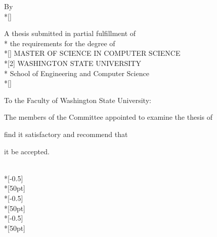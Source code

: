 \doublespacing

\begin{titlepage}
    \begin{center}
        \begin{doublespace}
            {\Large \textbf{\covertitle}}
        \end{doublespace}
	     
        \begin{singlespace}
            \vfill
            By \\*[\baselineskip]
            \textbf{\MakeUppercase \paperauthor}
           
            \vfill
            A thesis submitted in partial fulfillment of\\*
            the requirements for the degree of\\*[\baselineskip]
            MASTER OF SCIENCE IN COMPUTER SCIENCE\\*[2\baselineskip]
            WASHINGTON STATE UNIVERSITY\\*
            School of Engineering and Computer Science\\*[\baselineskip]
            \papermonth~\paperyear
        \end{singlespace}
    \end{center}
\end{titlepage}

\newpage
\setcounter{page}{2}
\pagestyle{headings}

\vspace*{150pt}
\noindent {}To the Faculty of Washington State University:

The members of the Committee appointed to examine the thesis of

\noindent {} find it satisfactory and recommend that

\noindent {}it be accepted.    

\vspace*{50pt}
	\begin{flushright}
		\makebox[0.5\textwidth]{\hrulefill}\\*[-0.5\baselineskip]
		\\*[50pt]
		\makebox[0.5\textwidth]{\hrulefill}\\*[-0.5\baselineskip]
		\makebox[0.5\textwidth][c]{\secondchair}
		\\*[50pt]
		\makebox[0.5\textwidth]{\hrulefill}\\*[-0.5\baselineskip]
		\makebox[0.5\textwidth][c]{\thirdchair}
		\\*[50pt]
	\end{flushright}

